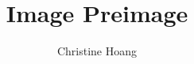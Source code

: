 \documentclass{article}
\title{Image Preimage}
\author{Christine Hoang}
\begin{document}
\maketitle

\section{}
\end{document}

